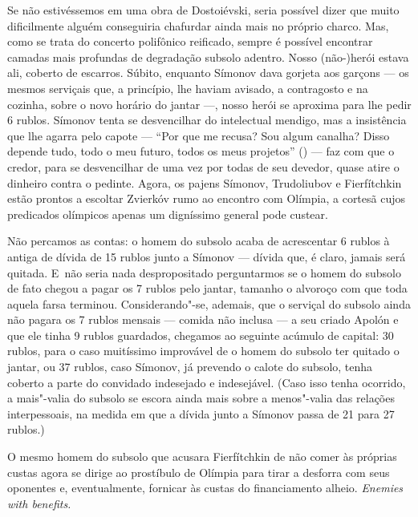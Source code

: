 Se não estivéssemos em uma obra de Dostoiévski, seria possível dizer que
muito dificilmente alguém conseguiria chafurdar ainda mais no próprio
charco. Mas, como se trata do concerto polifônico reificado, sempre é
possível encontrar camadas mais profundas de degradação subsolo adentro.
Nosso \mbox{(não-)herói} estava ali, coberto de escarros. Súbito, enquanto
Símonov dava gorjeta aos garçons --- os mesmos serviçais que, a
princípio, lhe haviam avisado, a contragosto e na cozinha, sobre o novo
horário do jantar ---, nosso herói se aproxima para lhe pedir 6 rublos.
Símonov tenta se desvencilhar do intelectual mendigo, mas a insistência
que lhe agarra pelo capote --- ``Por que me recusa? Sou algum canalha?
Disso depende tudo, todo o meu futuro, todos os meus projetos'' ()
--- faz com que o credor, para se desvencilhar de uma vez por todas de
seu devedor, quase atire o dinheiro contra o pedinte. Agora, os pajens
Símonov, Trudoliubov e Fierfítchkin estão prontos a escoltar Zvierkóv
rumo ao encontro com Olímpia, a cortesã cujos predicados olímpicos
apenas um digníssimo general pode custear.

Não percamos as contas: o homem do subsolo acaba de acrescentar 6 rublos
à antiga de dívida de 15 rublos junto a Símonov --- dívida que, é claro,
jamais será quitada. E~não seria nada despropositado perguntarmos se o
homem do subsolo de fato chegou a pagar os 7 rublos pelo jantar, tamanho
o alvoroço com que toda aquela farsa terminou. Considerando"-se, ademais,
que o serviçal do subsolo ainda não pagara os 7 rublos mensais --- comida
não inclusa --- a seu criado Apolón e que ele tinha 9 rublos guardados,
chegamos ao seguinte acúmulo de capital: 30 rublos, para o caso
muitíssimo improvável de o homem do subsolo ter quitado o jantar, ou 37
rublos, caso Símonov, já prevendo o calote do subsolo, tenha coberto a
parte do convidado indesejado e indesejável. (Caso isso tenha ocorrido,
a mais"-valia do subsolo se escora ainda mais sobre a menos"-valia das
relações interpessoais, na medida em que a dívida junto a Símonov passa
de 21 para 27 rublos.)

O mesmo homem do subsolo que acusara Fierfítchkin de não comer às
próprias custas agora se dirige ao prostíbulo de Olímpia para tirar a
desforra com seus oponentes e, eventualmente, fornicar às custas do
financiamento alheio. \emph{Enemies with benefits.}

